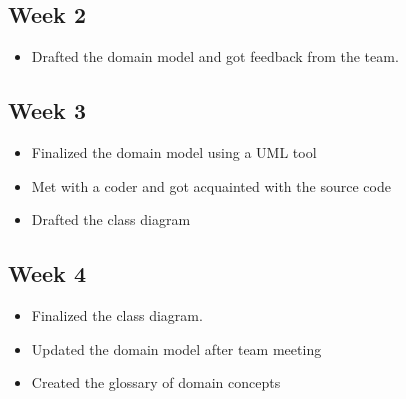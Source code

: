 \documentclass[12pt]{article}
\begin{document}
\maketitle

\subsection*{Week 2}

\begin{itemize}
    \item Drafted the domain model and got feedback from the team.
\end{itemize}

\subsection*{Week 3}

\begin{itemize}
    \item Finalized the domain model using a UML tool
    \item Met with a coder and got acquainted with the source code
    \item Drafted the class diagram

\end{itemize}

\subsection*{Week 4}

\begin{itemize}
    \item Finalized the class diagram.
    \item Updated the domain model after team meeting
    \item Created the glossary of domain concepts

\end{itemize}
\end{document}
